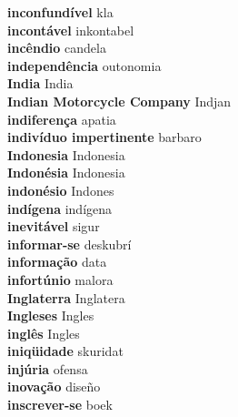 \textbf{ inconfundível  } kla \\
\textbf{ incontável  } inkontabel \\
\textbf{ incêndio  } candela \\
\textbf{ independência  } outonomia \\
\textbf{ India  } India \\
\textbf{ Indian Motorcycle Company  } Indjan \\
\textbf{ indiferença  } apatia \\
\textbf{ indivíduo impertinente  } barbaro \\
\textbf{ Indonesia  } Indonesia \\
\textbf{ Indonésia  } Indonesia \\
\textbf{ indonésio  } Indones \\
\textbf{ indígena  } indígena \\
\textbf{ inevitável  } sigur \\
\textbf{ informar-se  } deskubrí \\
\textbf{ informação  } data \\
\textbf{ infortúnio  } malora \\
\textbf{ Inglaterra  } Inglatera \\
\textbf{ Ingleses  } Ingles \\
\textbf{ inglês  } Ingles \\
\textbf{ iniqüidade  } skuridat \\
\textbf{ injúria  } ofensa \\
\textbf{ inovação  } diseño \\
\textbf{ inscrever-se  } boek \\
